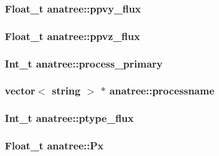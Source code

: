 \hypertarget{classanatree_a3f12da41c30cfa5b0d5b2cd7a49f6879}{
\subsubsection[{ppvy\-\_\-flux}]{\setlength{\rightskip}{0pt plus 5cm}Float\-\_\-t anatree\-::ppvy\-\_\-flux}}\label{classanatree_a3f12da41c30cfa5b0d5b2cd7a49f6879}
\hypertarget{classanatree_a79454ca2f63ac3ca7d5cf0861e88bf5c}{
\subsubsection[{ppvz\-\_\-flux}]{\setlength{\rightskip}{0pt plus 5cm}Float\-\_\-t anatree\-::ppvz\-\_\-flux}}\label{classanatree_a79454ca2f63ac3ca7d5cf0861e88bf5c}
\hypertarget{classanatree_a104d39060f7947f9e5c2ee46e33ef686}{
\subsubsection[{process\-\_\-primary}]{\setlength{\rightskip}{0pt plus 5cm}Int\-\_\-t anatree\-::process\-\_\-primary}}\label{classanatree_a104d39060f7947f9e5c2ee46e33ef686}
\hypertarget{classanatree_a5f73011fc98884bb1cfe96f9dcc863e7}{
\subsubsection[{processname}]{\setlength{\rightskip}{0pt plus 5cm}vector$<$ string $>$ $\ast$ anatree\-::processname}}\label{classanatree_a5f73011fc98884bb1cfe96f9dcc863e7}
\hypertarget{classanatree_a390d9cff04f0d42915a66d77eedd8ef9}{
\subsubsection[{ptype\-\_\-flux}]{\setlength{\rightskip}{0pt plus 5cm}Int\-\_\-t anatree\-::ptype\-\_\-flux}}\label{classanatree_a390d9cff04f0d42915a66d77eedd8ef9}
\hypertarget{classanatree_a81331574efd57def158e542793f3d8bf}{
\subsubsection[{Px}]{\setlength{\rightskip}{0pt plus 5cm}Float\-\_\-t anatree\-::\-Px}}\label{classanatree_a81331574efd57def158e542793f3d8bf}
